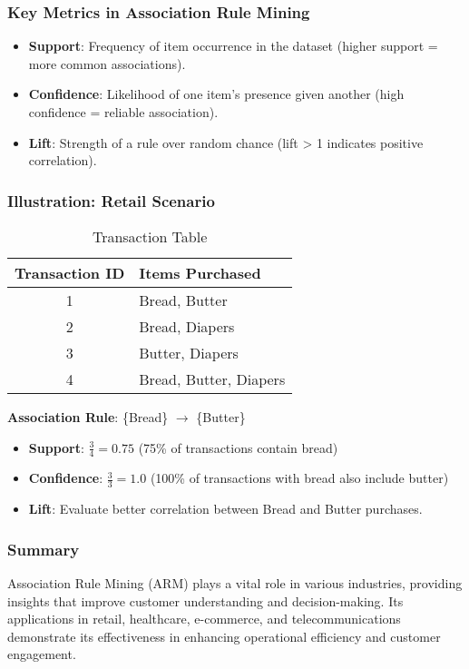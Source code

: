 \documentclass[aspectratio=169]{beamer}
\begin{document}
\begin{frame}[fragile]
    \frametitle{Key Metrics in Association Rule Mining}
    \begin{itemize}
        \item \textbf{Support}: Frequency of item occurrence in the dataset (higher support = more common associations).
        \item \textbf{Confidence}: Likelihood of one item's presence given another (high confidence = reliable association).
        \item \textbf{Lift}: Strength of a rule over random chance (lift > 1 indicates positive correlation).
    \end{itemize}
\end{frame}

\begin{frame}[fragile]
    \frametitle{Illustration: Retail Scenario}
    \begin{table}[h]
    \centering
    \begin{tabular}{|c|l|}
        \hline
        Transaction ID & Items Purchased \\
        \hline
        1 & Bread, Butter \\
        2 & Bread, Diapers \\
        3 & Butter, Diapers \\
        4 & Bread, Butter, Diapers \\
        \hline
    \end{tabular}
    \caption{Transaction Table}
    \end{table}
    
    \textbf{Association Rule}: \{Bread\} $\rightarrow$ \{Butter\}
    \begin{itemize}
        \item \textbf{Support}: $\frac{3}{4} = 0.75$ (75\% of transactions contain bread)
        \item \textbf{Confidence}: $\frac{3}{3} = 1.0$ (100\% of transactions with bread also include butter)
        \item \textbf{Lift}: Evaluate better correlation between Bread and Butter purchases.
    \end{itemize}
\end{frame}

\begin{frame}[fragile]
    \frametitle{Summary}
    Association Rule Mining (ARM) plays a vital role in various industries, providing insights that improve customer understanding and decision-making. Its applications in retail, healthcare, e-commerce, and telecommunications demonstrate its effectiveness in enhancing operational efficiency and customer engagement.
\end{frame}
\end{document}
